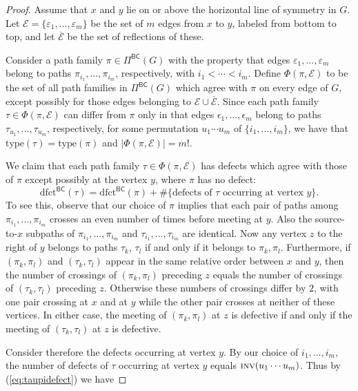 \documentclass[12pt]{amsart}
\theoremstyle{definition}
\numberwithin{equation}{section}
\newcommand{\ol}[1]{\overline{#1}}
\newcommand{\inv}{\textsc{inv}}
\newcommand{\dfct}{\mathrm{dfct}}
\newcommand{\type}{\mathrm{type}}
\newcommand{\PiBC}{\Pi^{\msfBC}}
\newcommand{\msfBC}{\mathsf{BC}}
\begin{document}
\begin{proof}
Assume that $x$ and $y$ lie on or above the horizontal line of symmetry in $G$. Let $\mathcal E = \{\varepsilon_1,\dotsc, \varepsilon_m\}$ be the set of $m$ edges from $x$ to $y$, labeled from bottom to top, and let $\ol{\mathcal E}$ be the set of reflections of these.  

Consider a path family $\pi \in \PiBC(G)$ with the property that
edges $\varepsilon_1,\dotsc,\varepsilon_m$ belong to
paths $\pi_{i_1},\dotsc,\pi_{i_m}$, 
respectively, with $i_1 < \cdots < i_m$.
Define 
$\Phi(\pi,\mathcal E)$ to be the set of all path families in $\PiBC(G)$ which agree with $\pi$ on every edge of $G$, except possibly for those edges belonging to $\mathcal E \cup \ol{\mathcal E}$.
Since each path family $\tau \in \Phi(\pi,\mathcal E)$ 
can differ from $\pi$
only in that 
edges $\epsilon_1,\dotsc,\epsilon_m$ belong to 
paths $\tau_{u_1},\dotsc,\tau_{u_m}$, respectively,
for some permutation $u_1 \cdots u_m$ of $\{i_1,\dotsc,i_m\}$, we have that
$\type(\tau) = \type(\pi)$ and 
$|\Phi(\pi,\mathcal E)| = m!$.
  

We claim that each path family $\tau \in \Phi(\pi,\mathcal E)$ has defects which agree with those of $\pi$ except possibly at the vertex $y$, where $\pi$ has no defect:
   \begin{equation}\label{eq:taupidefect}
    \dfct^{\msfBC}(\tau) = \dfct^{\msfBC}(\pi) + \# \{ \text{defects of $\tau$ occurring at vertex $y$}\}.
\end{equation}
To see this, observe that our choice of $\pi$ implies that each pair of paths among $\pi_{i_1},\dotsc,\pi_{i_m}$ crosses an even number of times before meeting at $y$.  Also the source-to-$x$ subpaths of $\pi_{i_1},\dotsc,\pi_{i_m}$ and $\tau_{i_1},\dotsc,\tau_{i_m}$ are identical. Now any vertex $z$ to the right of $y$
belongs to
paths $\tau_k$, $\tau_l$ if and only if it belongs to $\pi_k, \pi_l$.
Furthermore, if $(\pi_k, \pi_l)$ and $(\tau_k,\tau_l)$ appear in the same relative order between $x$ and $y$, then the number of crossings of $(\pi_k, \pi_l)$ preceding $z$ equals the number of crossings of $(\tau_k, \tau_l)$ preceding $z$. Otherwise these numbers of crossings differ by $2$, with one pair crossing at $x$ and at $y$ while the other pair crosses at neither of these vertices.
In either case, the meeting of $(\pi_k, \pi_l)$ at $z$ is defective if and only if the meeting of $(\tau_k, \tau_l)$ at $z$ is defective.


Consider therefore the defects occurring at vertex $y$. By our choice of $i_1,\dotsc,i_m$, %
the number of defects of $\tau$ occurring at vertex $y$ equals $\inv(u_1 \cdots u_m)$. Thus by (\ref{eq:taupidefect}) we have 


\end{proof}
\end{document}
